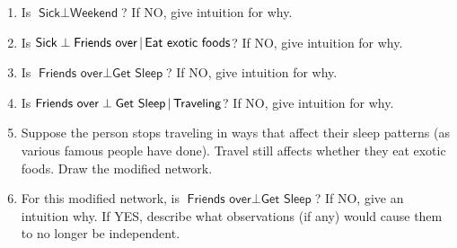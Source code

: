 \documentclass[submit]{harvardml}
\newcommand{\attr}[1]{\textsf{#1}}
\begin{document}
\begin{problem}
\begin{enumerate}
\item Is $\attr{Sick} \perp \attr{Weekend}$?
  If NO, give intuition for why.


\item Is $\attr{Sick} \perp \attr{Friends over}\given \attr{Eat exotic
  foods}$? If NO, give intuition for why.


\item Is $\attr{Friends over} \perp \attr{Get Sleep}$? If NO, give
  intuition for why.

\item Is $\attr{Friends over} \perp \attr{Get Sleep} \given
  \attr{Traveling}$? If NO, give intuition for why.

\item Suppose the person stops traveling in ways that affect their
  sleep patterns (as various famous people have done).  Travel still
  affects whether they eat exotic foods.  Draw the modified network.

\item For this modified network, is $\attr{Friends over} \perp
  \attr{Get Sleep}$? If NO, give an intuition why.  If YES,
  describe what observations (if any) would cause them to no longer be
  independent.

\end{enumerate}
\end{problem}
\end{document}
